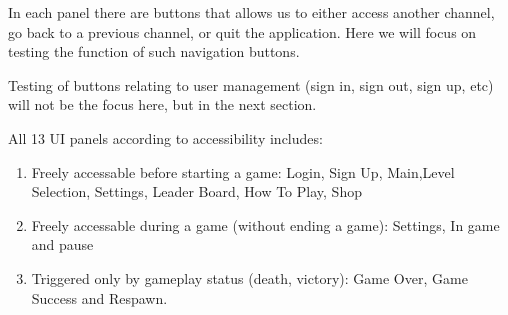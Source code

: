 \documentclass[11pt]{article}
\begin{document}
    In each panel there are buttons that allows us to either access another channel, go back to a previous channel, or quit the application. Here we will focus on testing the function of such navigation buttons. 
    
    Testing of buttons relating to user management (sign in, sign out, sign up, etc) will not be the focus here, but in the next section.
    
    All 13 UI panels according to accessibility includes:
        \begin{enumerate}
            \item Freely accessable before starting a game: Login, Sign Up, Main,Level Selection, Settings, Leader Board, How To Play, Shop
            \item Freely accessable during a game (without ending a game): Settings, In game and pause
            \item Triggered only by gameplay status (death, victory): Game Over, Game Success and Respawn.
        \end{enumerate}
\end{document}
